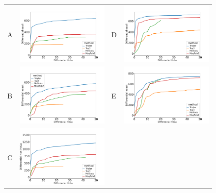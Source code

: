 \documentclass[11pt]{article}
\begin{document}
\begin{figure}[hbt]
    \centering
    \begin{tabular}{lclc} 
        A & \includegraphics[width=0.4\linewidth]{../../result/report_plots_pipeline/diff_HeLa_vs_nonHeLa_ID_ecoli_0.51.png} & 
        D & \includegraphics[width=0.4\linewidth]{../../result/report_plots_pipeline/diff_HeLa_vs_nonHeLa_PS_ecoli_0.51.png} \\ 
        B & \includegraphics[width=0.4\linewidth]{../../result/report_plots_pipeline/diff_HeLa_vs_nonHeLa_ID_yeast_0.51.png} & 
        E & \includegraphics[width=0.4\linewidth]{../../result/report_plots_pipeline/diff_HeLa_vs_nonHeLa_PS_yeast_0.51.png} \\
        C & \includegraphics[width=0.45\linewidth]{../../result/report_plots_pipeline/diff_HeLa_vs_nonHeLa_ID_all_0.51.png} & 

\end{tabular}
\end{figure}
\end{document}
